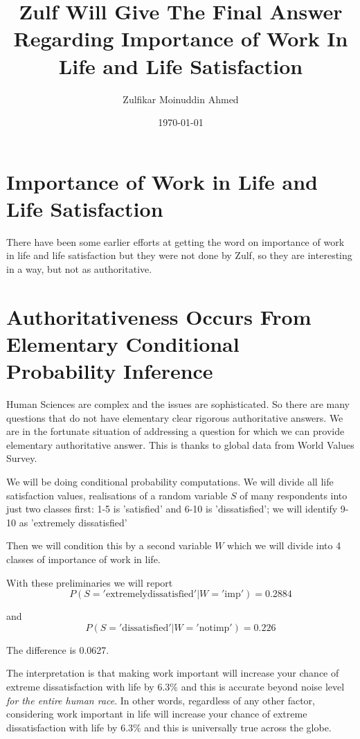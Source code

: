 \documentclass{amsart}
\title{Zulf Will Give The Final Answer Regarding Importance of Work In Life and Life Satisfaction}
\author{Zulfikar Moinuddin Ahmed}
\date{\today}
\begin{document}
\maketitle

\section{Importance of Work in Life and Life Satisfaction}

There have been some earlier efforts at getting the word on importance of work in life and life satisfaction but they were not done by Zulf, so they are interesting in a way, but not as authoritative.

\section{Authoritativeness Occurs From Elementary Conditional Probability Inference}

Human Sciences are complex and the issues are sophisticated.  So there are many questions that do not have elementary clear rigorous authoritative answers.  We are in the fortunate situation of addressing a question for which we can provide elementary authoritative answer.  This is thanks to global data from World Values Survey.

We will be doing conditional probability computations.  We will divide all life satisfaction values, realisations of a random variable $S$ of many respondents into just two classes first: 1-5 is 'satisfied' and 6-10 is 'dissatisfied'; we will identify 9-10 as 'extremely dissatisfied' 


  Then we will condition this by a second variable $W$ which we will divide into 4 classes of importance of work in life.  
  
With these preliminaries we will report
\[
P( S=\mathrm{'extremely dissatisfied'} | W=\mathrm{'imp'}) = 0.2884
\]

and
\[
P( S=\mathrm{'dissatisfied'} | W=\mathrm{'not imp'}) = 0.226
\]

The difference is 0.0627. 

The interpretation is that making work important will increase your chance of extreme dissatisfaction with life by 6.3\% and this is accurate beyond noise level {\em for the entire human race}.  In other words, regardless of any other factor, considering work important in life will increase your chance of extreme dissatisfaction with life by 6.3\% and this is universally true across the globe.
\end{document}
